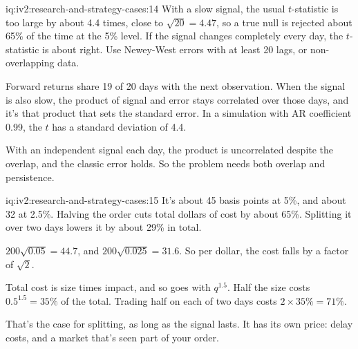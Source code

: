 \begin{solution}{iq:iv2:research-and-strategy-cases:14}
With a slow signal, the usual $t$-statistic is too large by about 4.4 times, close to $\sqrt{20} = 4.47$, so a true null is rejected about 65\% of the time at the 5\% level. If the signal changes completely every day, the $t$-statistic is about right. Use Newey-West errors with at least 20 lags, or non-overlapping data.

Forward returns share 19 of 20 days with the next observation. When the signal is also slow, the product of signal and error stays correlated over those days, and it's that product that sets the standard error. In a simulation with AR coefficient 0.99, the $t$ has a standard deviation of 4.4.

With an independent signal each day, the product is uncorrelated despite the overlap, and the classic error holds. So the problem needs both overlap and persistence.

\end{solution}

\begin{solution}{iq:iv2:research-and-strategy-cases:15}
It's about 45 basis points at 5\%, and about 32 at 2.5\%. Halving the order cuts total dollars of cost by about 65\%. Splitting it over two days lowers it by about 29\% in total.

$200\sqrt{0.05} = 44.7$, and $200\sqrt{0.025} = 31.6$. So per dollar, the cost falls by a factor of $\sqrt{2}$.

Total cost is size times impact, and so goes with $q^{1.5}$. Half the size costs $0.5^{1.5} = 35\%$ of the total. Trading half on each of two days costs $2 \times 35\% = 71\%$.

That's the case for splitting, as long as the signal lasts. It has its own price: delay costs, and a market that's seen part of your order.

\end{solution}

